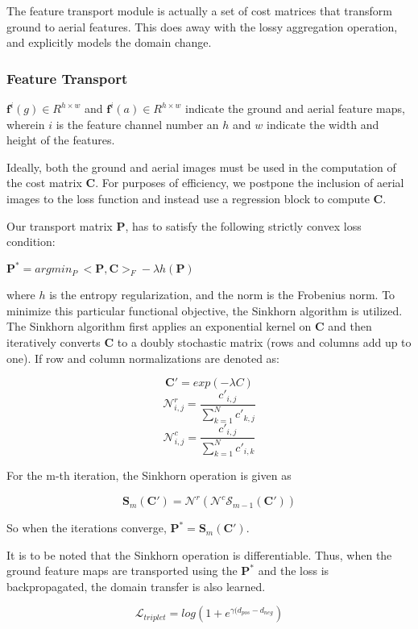 The feature transport module is actually a set of cost matrices that transform ground to aerial features. This does away with the lossy aggregation operation, and explicitly models the domain change.

\subsubsection{Feature Transport}
$\mathbf{f}^i(g) \in R^{h \times w}$ and $\mathbf{f}^i(a) \in R^{h \times w}$ indicate the ground and aerial feature maps, wherein $i$ is the feature channel number an $h$ and $w$ indicate the width and height of the features.

Ideally, both the ground and aerial images must be used in the computation of the cost matrix $\mathbf{C}$. For purposes of efficiency, we postpone the inclusion of aerial images to the loss function and instead use a regression block to compute $\mathbf{C}$.

Our transport matrix $\mathbf{P}$, has to satisfy the following strictly convex loss condition:

$\mathbf{P}^* = argmin_{P} \ <\mathbf{P}, \mathbf{C}>_F - \lambda h(\mathbf{P})
$

where $h$ is the entropy regularization, and the norm is the Frobenius norm. To minimize this particular functional objective, the Sinkhorn algorithm is utilized. The Sinkhorn algorithm first applies an exponential kernel on $\mathbf{C}$ and then iteratively converts $\mathbf{C}$ to a doubly stochastic matrix (rows and columns add up to one). If row and column normalizations are denoted as:

\[\mathbf{C}' = exp(-\lambda C)\]
\[\mathcal{N}^r_{i, j} = \frac{c'_{i,j}}{\sum_{k=1}^{N} c'_{k,j}} \]
\[\mathcal{N}^c_{i, j} = \frac{c'_{i,j}}{\sum_{k=1}^{N}c'_{i,k}} \]

For the m-th iteration, the Sinkhorn operation is given as 

\[\mathbf{S}_m(\mathbf{C}') = \mathcal{N}^r(\mathcal{N}^c \mathcal{S}_{m-1}(\mathbf{C}'))\]

So when the iterations converge, $\mathbf{P}^* = \mathbf{S}_m(\mathbf{C}')$.

It is to be noted that the Sinkhorn operation is differentiable. Thus, when the ground feature maps are transported using the $\mathbf{P}^*$ and the loss is backpropagated, the domain transfer is also learned.

\[\mathcal{L}_{triplet} = log(1 + e^{\gamma (d_{pos} - d_{neg}})\]

